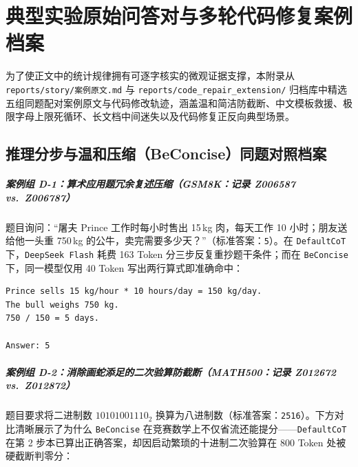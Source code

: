 \chapter{典型实验原始问答对与多轮代码修复案例档案}\label{app:cases}

为了使正文中的统计规律拥有可逐字核实的微观证据支撑，本附录从 \texttt{reports/story/案例原文.md} 与 \texttt{reports/code\_repair\_extension/} 归档库中精选五组同题配对案例原文与代码修改轨迹，涵盖温和简洁防截断、中文模板救援、极限字母上限死循环、长文档中间迷失以及代码修复正反向典型场景。

\section{推理分步与温和压缩（BeConcise）同题对照档案}

\paragraph{案例组 D-1：算术应用题冗余复述压缩（GSM8K：记录 Z006587 vs.\ Z006787）}题目询问：“屠夫 Prince 工作时每小时售出 15\,kg 肉，每天工作 10 小时；朋友送给他一头重 750\,kg 的公牛，卖完需要多少天？”（标准答案：\texttt{5}）。在 \texttt{DefaultCoT} 下，\texttt{DeepSeek Flash} 耗费 163 Token 分三步反复重抄题干条件；而在 \texttt{BeConcise} 下，同一模型仅用 40 Token 写出两行算式即准确命中：

\begin{lstlisting}[language={}, numbers=none, caption={记录 Z006787（deepseek / gsm8k / BeConcise，40 Token，得分 1，stop）}]
Prince sells 15 kg/hour * 10 hours/day = 150 kg/day.
The bull weighs 750 kg.
750 / 150 = 5 days.

Answer: 5
\end{lstlisting}

\paragraph{案例组 D-2：消除画蛇添足的二次验算防截断（MATH500：记录 Z012672 vs.\ Z012872）}题目要求将二进制数 $10101001110_2$ 换算为八进制数（标准答案：\texttt{2516}）。下方对比清晰展示了为什么 \texttt{BeConcise} 在竞赛数学上不仅省流还能提分——\texttt{DefaultCoT} 在第 2 步本已算出正确答案，却因启动繁琐的十进制二次验算在 800 Token 处被硬截断判零分：

